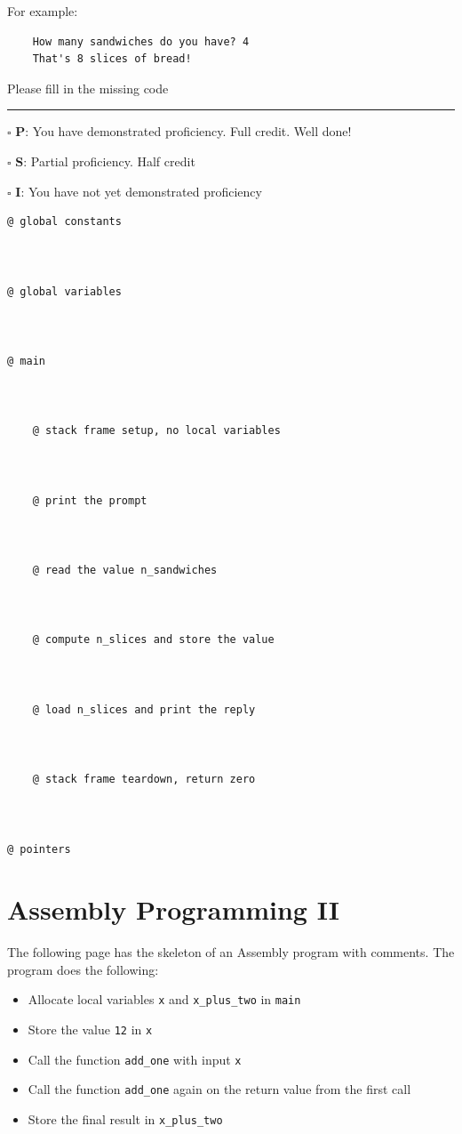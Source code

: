 \documentclass[12pt]{article}
\begin{document}
For example:
\begin{verbatim}
    How many sandwiches do you have? 4
    That's 8 slices of bread!
\end{verbatim}

Please fill in the missing code

\vfill

\rule[1ex]{\textwidth}{.1pt}

$\square$ \textbf{P}: You have demonstrated proficiency. Full credit. Well done!

$\square$ \textbf{S}: Partial proficiency. Half credit

$\square$ \textbf{I}: You have not yet demonstrated proficiency

\newpage

\begin{verbatim}
@ global constants



@ global variables



@ main


    
    @ stack frame setup, no local variables



    @ print the prompt



    @ read the value n_sandwiches



    @ compute n_slices and store the value



    @ load n_slices and print the reply



    @ stack frame teardown, return zero



@ pointers
\end{verbatim}



\section*{Assembly Programming II}

The following page has the skeleton of an Assembly program with comments. The program does the following:
\begin{itemize}
    \item Allocate local variables \texttt{x} and \texttt{x\_plus\_two} in \texttt{main}
    \item Store the value \texttt{12} in \texttt{x}
    \item Call the function \texttt{add\_one} with input \texttt{x}
    \item Call the function \texttt{add\_one} again on the return value from the first call
    \item Store the final result in \texttt{x\_plus\_two}
\end{itemize}
\end{document}
